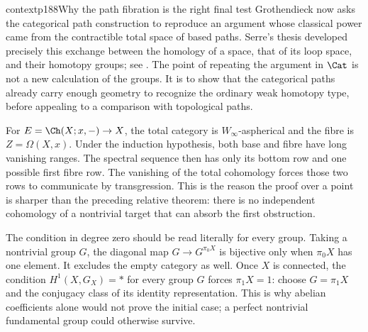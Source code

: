 \begin{dcomment}{context}{p188}{Why the path fibration is the right final test}
Grothendieck now asks the categorical path construction to reproduce an argument whose classical power came from the contractible total space of based paths. Serre's thesis developed precisely this exchange between the homology of a space, that of its loop space, and their homotopy groups; see \citet[Chapter~IV, \S5, Proposition~7]{Serre1951}. The point of repeating the argument in $\Cat$ is not a new calculation of the groups. It is to show that the categorical paths already carry enough geometry to recognize the ordinary weak homotopy type, before appealing to a comparison with topological paths.

For $E=\Ch(X;x,-)\to X$, the total category is $W_\infty$-aspherical and the fibre is $Z=\Omega(X,x)$. Under the induction hypothesis, both base and fibre have long vanishing ranges. The spectral sequence then has only its bottom row and one possible first fibre row. The vanishing of the total cohomology forces those two rows to communicate by transgression. This is the reason the proof over a point is sharper than the preceding relative theorem: there is no independent cohomology of a nontrivial target that can absorb the first obstruction.

The condition in degree zero should be read literally for every group. Taking a nontrivial group $G$, the diagonal map $G\to G^{\pi_0X}$ is bijective only when $\pi_0X$ has one element. It excludes the empty category as well. Once $X$ is connected, the condition $H^1(X,G_X)=*$ for every group $G$ forces $\pi_1X=1$: choose $G=\pi_1X$ and the conjugacy class of its identity representation. This is why abelian coefficients alone would not prove the initial case; a perfect nontrivial fundamental group could otherwise survive.
\end{dcomment}

